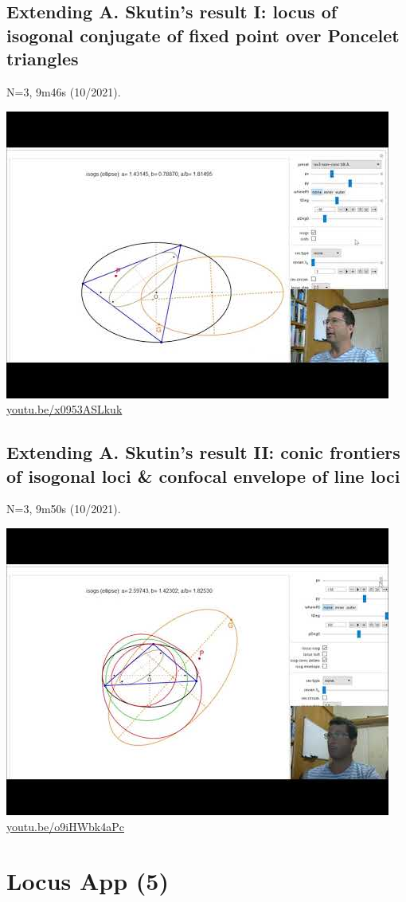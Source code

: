 \documentclass[12pt]{amsart}
\begin{document}
\subsection{Extending A. Skutin's result I: locus of isogonal conjugate of fixed point over Poncelet triangles}
\label{vid:x0953ASLkuk}
\noindent N=3, 9m46s (10/2021). 
\begin{center}\includegraphics[width=.5\textwidth]{pics/x0953ASLkuk.jpg} \\ 
\href{https://youtu.be/x0953ASLkuk}{\url{youtu.be/x0953ASLkuk}}\end{center}
% 

\subsection{Extending A. Skutin's result II: conic frontiers of isogonal loci \& confocal envelope of line loci}
\label{vid:o9iHWbk4aPc}
\noindent N=3, 9m50s (10/2021). 
\begin{center}\includegraphics[width=.5\textwidth]{pics/o9iHWbk4aPc.jpg} \\ 
\href{https://youtu.be/o9iHWbk4aPc}{\url{youtu.be/o9iHWbk4aPc}}\end{center}
% 


\section{Locus App (5)}
\end{document}
